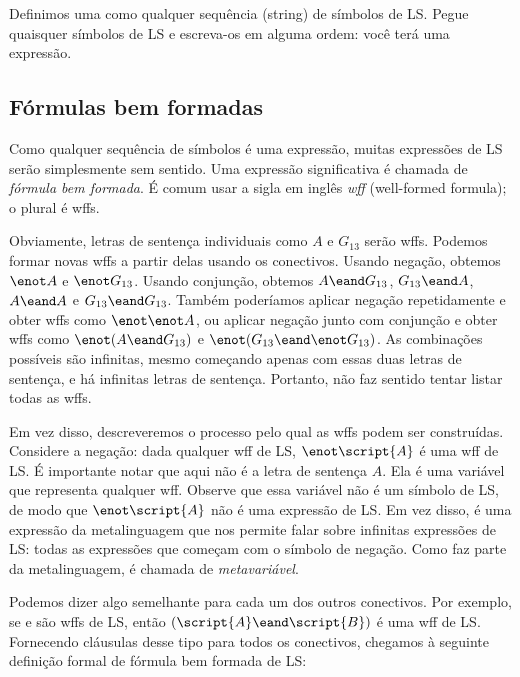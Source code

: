 Definimos uma  como qualquer sequência (string) de símbolos de LS. Pegue quaisquer símbolos de LS e escreva-os em alguma ordem: você terá uma expressão.


\subsection{Fórmulas bem formadas}

Como qualquer sequência de símbolos é uma expressão, muitas expressões de LS serão simplesmente sem sentido. Uma expressão significativa é chamada de \emph{fórmula bem formada}. É comum usar a sigla em inglês \emph{wff} (well-formed formula); o plural é wffs.

Obviamente, letras de sentença individuais como $A$ e $G_{13}$ serão wffs. Podemos formar novas wffs a partir delas usando os conectivos. Usando negação, obtemos $\enot A$ e $\enot G_{13}$. Usando conjunção, obtemos $A \eand G_{13}$, $G_{13} \eand A$, $A \eand A$ e $G_{13} \eand G_{13}$. Também poderíamos aplicar negação repetidamente e obter wffs como $\enot \enot A$, ou aplicar negação junto com conjunção e obter wffs como $\enot(A \eand G_{13})$ e $\enot(G_{13} \eand \enot G_{13})$. As combinações possíveis são infinitas, mesmo começando apenas com essas duas letras de sentença, e há infinitas letras de sentença. Portanto, não faz sentido tentar listar todas as wffs.

Em vez disso, descreveremos o processo pelo qual as wffs podem ser construídas. Considere a negação: dada qualquer wff  de LS, $\enot\script{A}$ é uma wff de LS. É importante notar que  aqui não é a letra de sentença $A$. Ela é uma variável que representa qualquer wff. Observe que essa variável  não é um símbolo de LS, de modo que $\enot\script{A}$ não é uma expressão de LS. Em vez disso, é uma expressão da metalinguagem que nos permite falar sobre infinitas expressões de LS: todas as expressões que começam com o símbolo de negação. Como  faz parte da metalinguagem, é chamada de \emph{metavariável}.

Podemos dizer algo semelhante para cada um dos outros conectivos. Por exemplo, se  e  são wffs de LS, então $(\script{A}\eand\script{B})$ é uma wff de LS. Fornecendo cláusulas desse tipo para todos os conectivos, chegamos à seguinte definição formal de {fórmula bem formada de LS}:

